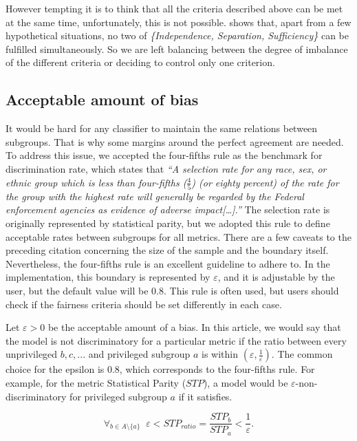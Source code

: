 However tempting it is to think that all the criteria described above
can be met at the same time, unfortunately, this is not possible.
\citet{barocas-hardt-narayanan} shows that, apart from a few
hypothetical situations, no two of \emph{\{Independence, Separation,
Sufficiency\}} can be fulfilled simultaneously. So we are left balancing
between the degree of imbalance of the different criteria or deciding to
control only one criterion.

\hypertarget{bias}{%
\subsection{Acceptable amount of bias}\label{bias}}

It would be hard for any classifier to maintain the same relations
between subgroups. That is why some margins around the perfect agreement
are needed. To address this issue, we accepted the four-fifths rule
\citep{adverseimpact} as the benchmark for discrimination rate, which
states that \emph{``A selection rate for any race, sex, or ethnic group
which is less than four-fifths (\emph{\(\frac{4}{5}\)}) (or eighty
percent) of the rate for the group with the highest rate will generally
be regarded by the Federal enforcement agencies as evidence of adverse
impact{[}\ldots{]}.''} The selection rate is originally represented by
statistical parity, but we adopted this rule to define acceptable rates
between subgroups for all metrics. There are a few caveats to the
preceding citation concerning the size of the sample and the boundary
itself. Nevertheless, the four-fifths rule is an excellent guideline to
adhere to. In the implementation, this boundary is represented by
\(\varepsilon\), and it is adjustable by the user, but the default value
will be 0.8. This rule is often used, but users should check if the
fairness criteria should be set differently in each case.

Let \(\varepsilon > 0\) be the acceptable amount of a bias. In this
article, we would say that the model is not discriminatory for a
particular metric if the ratio between every unprivileged \(b, c, ...\)
and privileged subgroup \(a\) is within
\((\varepsilon, \frac{1}{\varepsilon})\). The common choice for the
epsilon is 0.8, which corresponds to the four-fifths rule. For example,
for the metric Statistical Parity (\(STP\)), a model would be
\(\varepsilon\)-non-discriminatory for privileged subgroup \(a\) if it
satisfies.

\begin{equation} 
\forall_{b \in A \setminus \{a\}} \;\;
   \varepsilon < STP_{ratio} = \frac{STP_b}{STP_a} < \frac{1}{\varepsilon}.
  \label{eq:ratio}
\end{equation}

